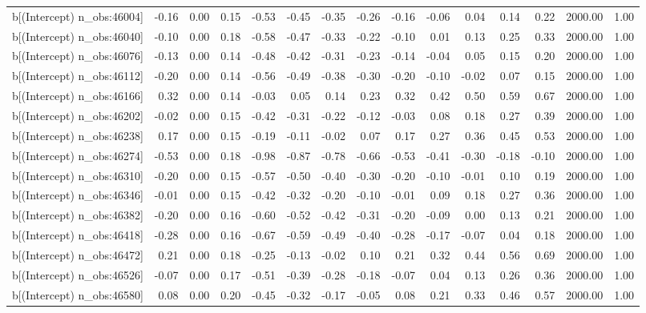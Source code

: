 \begin{table}[ht]
\begin{tabular}{rrrrrrrrrrrrrrr}
  b[(Intercept) n\_obs:46004] & -0.16 & 0.00 & 0.15 & -0.53 & -0.45 & -0.35 & -0.26 & -0.16 & -0.06 & 0.04 & 0.14 & 0.22 & 2000.00 & 1.00 \\ 
  b[(Intercept) n\_obs:46040] & -0.10 & 0.00 & 0.18 & -0.58 & -0.47 & -0.33 & -0.22 & -0.10 & 0.01 & 0.13 & 0.25 & 0.33 & 2000.00 & 1.00 \\ 
  b[(Intercept) n\_obs:46076] & -0.13 & 0.00 & 0.14 & -0.48 & -0.42 & -0.31 & -0.23 & -0.14 & -0.04 & 0.05 & 0.15 & 0.20 & 2000.00 & 1.00 \\ 
  b[(Intercept) n\_obs:46112] & -0.20 & 0.00 & 0.14 & -0.56 & -0.49 & -0.38 & -0.30 & -0.20 & -0.10 & -0.02 & 0.07 & 0.15 & 2000.00 & 1.00 \\ 
  b[(Intercept) n\_obs:46166] & 0.32 & 0.00 & 0.14 & -0.03 & 0.05 & 0.14 & 0.23 & 0.32 & 0.42 & 0.50 & 0.59 & 0.67 & 2000.00 & 1.00 \\ 
  b[(Intercept) n\_obs:46202] & -0.02 & 0.00 & 0.15 & -0.42 & -0.31 & -0.22 & -0.12 & -0.03 & 0.08 & 0.18 & 0.27 & 0.39 & 2000.00 & 1.00 \\ 
  b[(Intercept) n\_obs:46238] & 0.17 & 0.00 & 0.15 & -0.19 & -0.11 & -0.02 & 0.07 & 0.17 & 0.27 & 0.36 & 0.45 & 0.53 & 2000.00 & 1.00 \\ 
  b[(Intercept) n\_obs:46274] & -0.53 & 0.00 & 0.18 & -0.98 & -0.87 & -0.78 & -0.66 & -0.53 & -0.41 & -0.30 & -0.18 & -0.10 & 2000.00 & 1.00 \\ 
  b[(Intercept) n\_obs:46310] & -0.20 & 0.00 & 0.15 & -0.57 & -0.50 & -0.40 & -0.30 & -0.20 & -0.10 & -0.01 & 0.10 & 0.19 & 2000.00 & 1.00 \\ 
  b[(Intercept) n\_obs:46346] & -0.01 & 0.00 & 0.15 & -0.42 & -0.32 & -0.20 & -0.10 & -0.01 & 0.09 & 0.18 & 0.27 & 0.36 & 2000.00 & 1.00 \\ 
  b[(Intercept) n\_obs:46382] & -0.20 & 0.00 & 0.16 & -0.60 & -0.52 & -0.42 & -0.31 & -0.20 & -0.09 & 0.00 & 0.13 & 0.21 & 2000.00 & 1.00 \\ 
  b[(Intercept) n\_obs:46418] & -0.28 & 0.00 & 0.16 & -0.67 & -0.59 & -0.49 & -0.40 & -0.28 & -0.17 & -0.07 & 0.04 & 0.18 & 2000.00 & 1.00 \\ 
  b[(Intercept) n\_obs:46472] & 0.21 & 0.00 & 0.18 & -0.25 & -0.13 & -0.02 & 0.10 & 0.21 & 0.32 & 0.44 & 0.56 & 0.69 & 2000.00 & 1.00 \\ 
  b[(Intercept) n\_obs:46526] & -0.07 & 0.00 & 0.17 & -0.51 & -0.39 & -0.28 & -0.18 & -0.07 & 0.04 & 0.13 & 0.26 & 0.36 & 2000.00 & 1.00 \\ 
  b[(Intercept) n\_obs:46580] & 0.08 & 0.00 & 0.20 & -0.45 & -0.32 & -0.17 & -0.05 & 0.08 & 0.21 & 0.33 & 0.46 & 0.57 & 2000.00 & 1.00 \\ 

\end{tabular}
\end{table}
